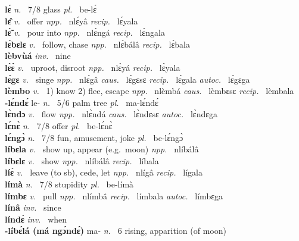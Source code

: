 {\bfseries lɛ́}  {\itshape n.~} 7/8 glass {\itshape pl.~} be-lɛ́    \\ 
{\bfseries lɛ̂}  {\itshape v.~} offer   {\itshape npp.~} nlɛ́yâ {\itshape recip.~} lɛ́yala  \\ 
{\bfseries lɛ̃̀}  {\itshape v.~} pour into   {\itshape npp.~} nlɛ̀ngá {\itshape recip.~} lɛ̀ngala  \\ 
{\bfseries lɛ̀bɛlɛ}  {\itshape v.~} follow, chase   {\itshape npp.~} nlɛ̀bálâ {\itshape recip.~} lɛ̀bala  \\ 
{\bfseries lèbvùá}  {\itshape inv.~} nine    \\ 
{\bfseries lɛ̀ɛ̀}  {\itshape v.~} uproot, disroot   {\itshape npp.~} nlɛ̀yá {\itshape recip.~} lɛ̀yala  \\ 
{\bfseries lɛ́gɛ}  {\itshape v.~} singe   {\itshape npp.~} nlɛ́gâ {\itshape caus.~} lɛ́gɛsɛ {\itshape recip.~} lɛ́gala {\itshape autoc.~} lɛ́gɛga  \\ 
{\bfseries lèmbo}  {\itshape v.~} 1) know 2) flee, escape   {\itshape npp.~} nlèmbá {\itshape caus.~} lèmbɛsɛ {\itshape recip.~} lèmbala \\ 
{\bfseries -lɛ́ndɛ́} le- {\itshape n.~} 5/6 palm tree {\itshape pl.~} ma-lɛ́ndɛ́    \\ 
{\bfseries lɛ̀ndɔ}  {\itshape v.~} flow   {\itshape npp.~} nlɛ̀ndá {\itshape caus.~} lɛ̀ndɛsɛ {\itshape autoc.~} lɛ̀ndɛga  \\ 
{\bfseries lɛ́nɛ̀}  {\itshape n.~} 7/8 offer {\itshape pl.~} be-lɛ́nɛ̀    \\ 
{\bfseries lɛ́ngɔ̀}  {\itshape n.~} 7/8 fun, amusement, joke {\itshape pl.~} be-lɛ́ngɔ̀    \\ 
{\bfseries líbɛla}  {\itshape v.~} show up, appear (e.g.\ moon)   {\itshape npp.~} nlíbálâ  \\ 
{\bfseries líbɛlɛ}  {\itshape v.~} show   {\itshape npp.~} nlíbálâ {\itshape recip.~} líbala  \\ 
{\bfseries líɛ̀}  {\itshape v.~} leave (to sb), cede, let   {\itshape npp.~} nlígâ {\itshape recip.~} lígala  \\ 
{\bfseries límà}  {\itshape n.~} 7/8 stupidity {\itshape pl.~} be-límà    \\ 
{\bfseries límbɛ}  {\itshape v.~} pull   {\itshape npp.~} nlímbâ {\itshape recip.~} límbala {\itshape autoc.~} límbɛga  \\ 
{\bfseries línâ}  {\itshape inv.~} since    \\ 
{\bfseries líndɛ̀}  {\itshape inv.~} when    \\ 
{\bfseries -líbɛ́lá (má ngɔ́ndɛ́)} ma- {\itshape n.~} 6  rising, apparition (of moon)    \\ 
